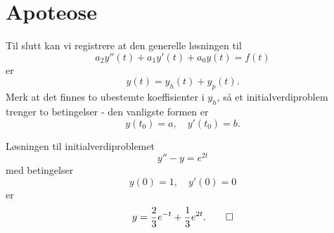 %
%
%


\section*{Apoteose}

Til slutt kan vi registrere at den generelle løsningen til 
\[
a_2y''(t)+a_1y'(t)+a_0y(t)=f(t)
\]
er
\[
y(t)=y_h(t)+y_p(t).
\]
 Merk at det finnes to ubestemte koeffisienter i $y_h$, så et initialverdiproblem trenger to betingelser - den vanligste formen er 
 \[
 y(t_0)=a, \quad  y'(t_0)=b.
\]

\begin{ex}
Løsningen til initialverdiproblemet
\[
y''-y=e^{2t}
\]
med betingelser
 \[
 y(0)=1, \quad  y'(0)=0
\]
er
\[
y=\frac{2}{3}e^{-t}+\frac{1}{3}e^{2t}.  \qedhere
\]
\end{ex}


\kapittelslutt
